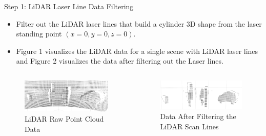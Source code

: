 \documentclass[9pt]{beamer}
\begin{document}
\begin{frame}[fragile]{Step 1: LiDAR Laser Line Data Filtering}
	\begin{itemize}
		\item Filter out the LiDAR laser lines that build
		a cylinder 3D shape from the laser standing point $(x=0, y=0, z=0)$.
		\item Figure 1 visualizes the LiDAR data for a single scene with LiDAR laser lines and Figure 2 visualizes the data after
		filtering out the Laser lines.
	\end{itemize}

	\begin{columns}
		\begin{column}{0.48\textwidth}
			\begin{figure}
				\centering
				\includegraphics[width=\textwidth]{images/ground_before2.png}
				\caption{LiDAR Raw Point Cloud Data}
			\end{figure}
		\end{column}
		\begin{column}{0.48\textwidth}
			\begin{figure}
				\centering
				\includegraphics[width=\textwidth]{images/ground_after2.png}		\caption{Data After Filtering the LiDAR Scan Lines}
			\end{figure}
		\end{column}
	\end{columns}

\end{frame}

\end{document}
